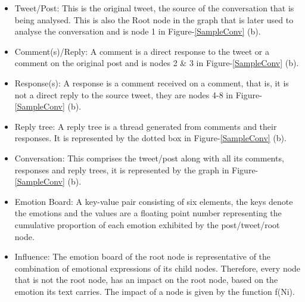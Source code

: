 \documentclass[acmtog]{acmart}
\begin{document}
\begin{itemize}
    \item Tweet/Post: This is the original tweet, the source of the conversation that is being analysed. This is also the Root node in the graph that is later used to analyse the conversation and is node 1 in Figure-\ref{SampleConv} (b).
    \item Comment(s)/Reply: A comment is a direct response to the tweet or a comment on the original post and is nodes 2 \& 3 in Figure-\ref{SampleConv} (b).
    \item Response(s): A response is a comment received on a comment, that is, it is not a direct reply to the source tweet, they are nodes 4-8 in Figure-\ref{SampleConv} (b).
    \item Reply tree:  A reply tree is a thread generated from comments and their responses. It is represented by the dotted box in Figure-\ref{SampleConv} (b).
    \item Conversation: This comprises the tweet/post along with all its comments, responses and reply trees, it is represented by the graph in Figure-\ref{SampleConv} (b).
    \item Emotion Board: A key-value pair consisting of six elements, the keys denote the emotions and the values are a floating point number representing the cumulative proportion of each emotion exhibited by the post/tweet/root node.
    \item Influence: The emotion board of the root node is representative of the combination of emotional expressions of its child nodes. Therefore, every node that is not the root node, has an impact on the root node, based on the emotion its text carries. The impact of a node is given by the function f(Ni). 
\end{itemize}



\end{document}
